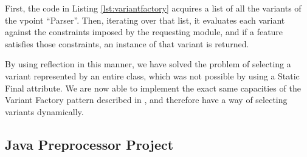 First, the code in Listing \ref{lst:variantfactory} acquires a list of all the \gls{variant}s of the \gls{vpoint} ``Parser''. Then, iterating over that list, it evaluates each \gls{variant} against the constraints imposed by the requesting module, and if a feature satisfies those constraints, an instance of that \gls{variant} is returned.

By using reflection in this manner, we have solved the problem of selecting a \gls{variant} represented by an entire class, which was not possible by using a Static Final attribute. We are now able to implement the exact same capacities of the Variant Factory pattern described in \cite{LASER:2015}, and therefore have a way of selecting \gls{variant}s dynamically.


\subsection{Java Preprocessor Project}
\label{sc:prepros}


